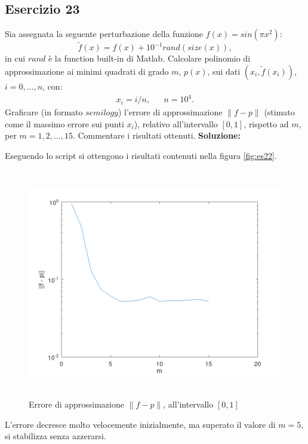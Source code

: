 \subsection{Esercizio 23}
Sia assegnata la seguente perturbazione della funzione $f(x) = sin(\pi x^2)$:
\[
    \tilde{f}(x) = f(x) + 10^{-1} rand(size(x)),
\]
in cui $rand$ è la function built-in di Matlab. Calcolare polinomio di approssimazione ai minimi
quadrati di grado $m$, $p(x)$, sui dati $(x_i, \tilde{f}(x_i))$, $i = 0, \dots, n$, con:
\begin{eqnarray*}
    x_i = i/n, & & n = 10^4.
\end{eqnarray*}
Graficare (in formato $semilogy$) l'errore di approssimazione $\|f - p\|$ (stimato come il massimo
errore sui punti $x_i$), relativo all'intervallo $[0, 1]$, rispetto ad $m$, per $m = 1, 2, \dots, 15$.
Commentare i risultati ottenuti.
\newline \textbf{Soluzione:}

Eseguendo lo script  si ottengono i risultati contenuti nella figura \ref{fig:es22}.
\begin{figure}[!ht]
    \centering
    \includegraphics[width=16cm,height=10cm,keepaspectratio]{capitolo4/es23_figure.png}
    \caption{Errore di approssimazione $\|f - p\|$, all'intervallo $[0, 1]$}
    \label{fig:es23}
\end{figure}
\FloatBarrier
L'errore decresce molto velocemente inizialmente, ma superato il valore di $m = 5$, si stabilizza
senza azzerarsi.
